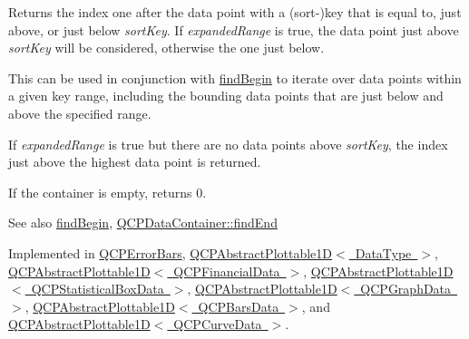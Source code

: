 Returns the index one after the data point with a (sort-\/)key that is equal to, just above, or just below {\itshape sort\+Key}. If {\itshape expanded\+Range} is true, the data point just above {\itshape sort\+Key} will be considered, otherwise the one just below.

This can be used in conjunction with \mbox{\hyperlink{class_q_c_p_plottable_interface1_d_a5b95783271306a4de97be54eac1e7d13}{find\+Begin}} to iterate over data points within a given key range, including the bounding data points that are just below and above the specified range.

If {\itshape expanded\+Range} is true but there are no data points above {\itshape sort\+Key}, the index just above the highest data point is returned.

If the container is empty, returns 0.

\begin{DoxySeeAlso}{See also}
\mbox{\hyperlink{class_q_c_p_plottable_interface1_d_a5b95783271306a4de97be54eac1e7d13}{find\+Begin}}, \mbox{\hyperlink{class_q_c_p_data_container_afb8b8f23cc2b7234a793a25ce79fe48f}{Q\+C\+P\+Data\+Container\+::find\+End}} 
\end{DoxySeeAlso}


Implemented in \mbox{\hyperlink{class_q_c_p_error_bars_ad22dd8499c6d45176ad0651751a0b0b0}{Q\+C\+P\+Error\+Bars}}, \mbox{\hyperlink{class_q_c_p_abstract_plottable1_d_a6e3ba20c9160d7361e58070390d10b1a}{Q\+C\+P\+Abstract\+Plottable1\+D$<$ Data\+Type $>$}}, \mbox{\hyperlink{class_q_c_p_abstract_plottable1_d_a6e3ba20c9160d7361e58070390d10b1a}{Q\+C\+P\+Abstract\+Plottable1\+D$<$ Q\+C\+P\+Financial\+Data $>$}}, \mbox{\hyperlink{class_q_c_p_abstract_plottable1_d_a6e3ba20c9160d7361e58070390d10b1a}{Q\+C\+P\+Abstract\+Plottable1\+D$<$ Q\+C\+P\+Statistical\+Box\+Data $>$}}, \mbox{\hyperlink{class_q_c_p_abstract_plottable1_d_a6e3ba20c9160d7361e58070390d10b1a}{Q\+C\+P\+Abstract\+Plottable1\+D$<$ Q\+C\+P\+Graph\+Data $>$}}, \mbox{\hyperlink{class_q_c_p_abstract_plottable1_d_a6e3ba20c9160d7361e58070390d10b1a}{Q\+C\+P\+Abstract\+Plottable1\+D$<$ Q\+C\+P\+Bars\+Data $>$}}, and \mbox{\hyperlink{class_q_c_p_abstract_plottable1_d_a6e3ba20c9160d7361e58070390d10b1a}{Q\+C\+P\+Abstract\+Plottable1\+D$<$ Q\+C\+P\+Curve\+Data $>$}}.

\mbox{\label{class_q_c_p_plottable_interface1_d_a67093e4ccf490ff5f7750640941ff34c}} 
